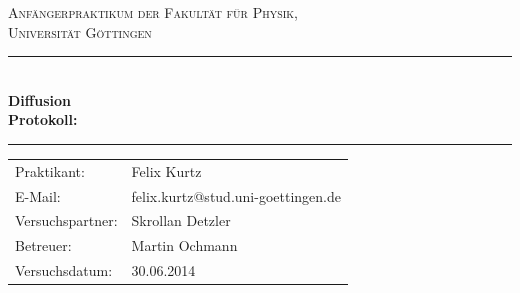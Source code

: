 \documentclass[12pt,a4paper,titlepage,headinclude,bibtotoc]{scrartcl}
\begin{document}
\begin{titlepage}
\centering
\textsc{\Large Anfängerpraktikum der Fakultät für
  Physik,\\[1.5ex] Universität Göttingen}

\vspace*{4.2cm}

\rule{\textwidth}{1pt}\\[0.5cm]
{\huge \bfseries
  Diffusion\\[1.5ex]
  Protokoll:}\\[0.5cm]
\rule{\textwidth}{1pt}

\vspace*{3.0cm}

\begin{Large}
\begin{tabular}{ll}
Praktikant:
 	&  Felix Kurtz\\

  E-Mail: 
	&  felix.kurtz@stud.uni-goettingen.de\\

Versuchspartner:
	&  Skrollan Detzler\\

 Betreuer: & Martin Ochmann\\
 Versuchsdatum: & 30.06.2014\\
\end{tabular}
\end{Large}

\vspace*{0.8cm}

\begin{Large}
\end{Large}

\end{titlepage}
\end{document}
